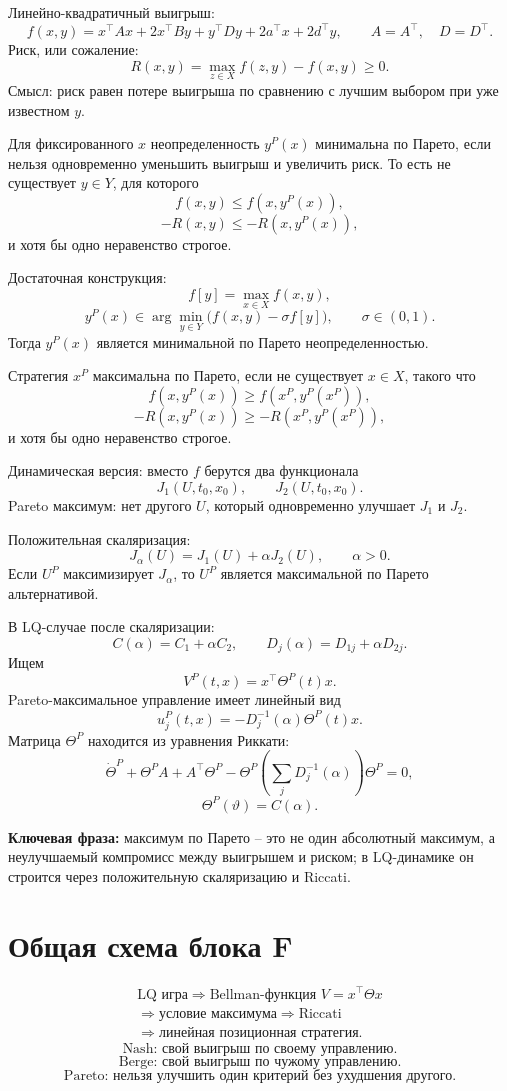 \documentclass[12pt,a4paper]{article}
\begin{document}
Линейно-квадратичный выигрыш:
\[
f(x,y)=x^{\top}Ax+2x^{\top}By+y^{\top}Dy+2a^{\top}x+2d^{\top}y,
\qquad A=A^{\top},
\quad D=D^{\top}.
\]
Риск, или сожаление:
\[
R(x,y)=\max_{z\in X}f(z,y)-f(x,y)\ge0.
\]
Смысл: риск равен потере выигрыша по сравнению с лучшим выбором при уже известном \(y\).

Для фиксированного \(x\) неопределенность \(y^P(x)\) минимальна по Парето, если нельзя одновременно уменьшить выигрыш и увеличить риск. То есть не существует \(y\in Y\), для которого
\[
f(x,y)\le f(x,y^P(x)),
\]
\[
-R(x,y)\le -R(x,y^P(x)),
\]
и хотя бы одно неравенство строгое.

Достаточная конструкция:
\[
f[y]=\max_{x\in X}f(x,y),
\]
\[
y^P(x)\in\arg\min_{y\in Y}\bigl(f(x,y)-\sigma f[y]\bigr),
\qquad \sigma\in(0,1).
\]
Тогда \(y^P(x)\) является минимальной по Парето неопределенностью.

Стратегия \(x^P\) максимальна по Парето, если не существует \(x\in X\), такого что
\[
f(x,y^P(x))\ge f(x^P,y^P(x^P)),
\]
\[
-R(x,y^P(x))\ge -R(x^P,y^P(x^P)),
\]
и хотя бы одно неравенство строгое.

Динамическая версия: вместо \(f\) берутся два функционала
\[
J_1(U,t_0,x_0),
\qquad J_2(U,t_0,x_0).
\]
Pareto максимум: нет другого \(U\), который одновременно улучшает \(J_1\) и \(J_2\).

Положительная скаляризация:
\[
J_\alpha(U)=J_1(U)+\alpha J_2(U),
\qquad \alpha>0.
\]
Если \(U^P\) максимизирует \(J_\alpha\), то \(U^P\) является максимальной по Парето альтернативой.

В LQ-случае после скаляризации:
\[
C(\alpha)=C_1+
\alpha C_2,
\qquad
D_j(\alpha)=D_{1j}+\alpha D_{2j}.
\]
Ищем
\[
V^P(t,x)=x^{\top}\Theta^P(t)x.
\]
Pareto-максимальное управление имеет линейный вид
\[
u_j^P(t,x)=-D_j^{-1}(\alpha)\Theta^P(t)x.
\]
Матрица \(\Theta^P\) находится из уравнения Риккати:
\[
\dot\Theta^P+
\Theta^P A+A^{\top}\Theta^P-
\Theta^P\left(\sum_jD_j^{-1}(\alpha)\right)\Theta^P=0,
\]
\[
\Theta^P(\vartheta)=C(\alpha).
\]

\textbf{Ключевая фраза:} максимум по Парето -- это не один абсолютный максимум, а неулучшаемый компромисс между выигрышем и риском; в LQ-динамике он строится через положительную скаляризацию и Riccati.

\section*{Общая схема блока F}
\[
\begin{gathered}
\text{LQ игра}\Rightarrow \text{Bellman-функция }V=x^{\top}\Theta x\\
\Rightarrow \text{условие максимума}\Rightarrow \text{Riccati}\\
\Rightarrow \text{линейная позиционная стратегия}.
\end{gathered}
\]
\[
\text{Nash: свой выигрыш по своему управлению.}
\]
\[
\text{Berge: свой выигрыш по чужому управлению.}
\]
\[
\text{Pareto: нельзя улучшить один критерий без ухудшения другого.}
\]
\end{document}
